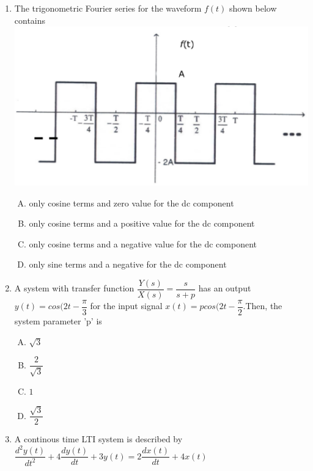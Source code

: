 \documentclass[journal,12pt,twocolumn]{IEEEtran}
\begin{document}
\begin{enumerate}[1.]
\begin{enumerate}[(A)]
\end{enumerate}
\item The trigonometric Fourier series for the waveform $f(t)$ shown below contains\\
\includegraphics[scale=0.4]{fig10.eps}

\begin{enumerate}[(A)]

\setlength\itemsep{1em}

\item only cosine terms and zero value for the dc component
\item only cosine terms and a positive value for the dc component
\item only cosine terms and a negative value for the dc component
\item only sine terms and a negative for the dc component

\end{enumerate}
\item A system with transfer function $\dfrac{Y(s)}{X(s)}=\dfrac{s}{s+p}$ has an output $y(t)=cos(2t-\dfrac{\pi}{3}$ for the input signal $x(t)=p cos(2t-\dfrac{\pi}{2}$.Then, the system parameter 'p' is


\begin{enumerate}[(A)]

\setlength\itemsep{1em}

\item $\sqrt{3}$
\item $\dfrac{2}{\sqrt{3}}$
\item $1$
\item $\dfrac{\sqrt{3}}{2}$

\end{enumerate}

\item A continous time LTI system is described by $\dfrac{d^{2}y(t)}{dt^{2}}+4\dfrac{dy(t)}{dt}+3y(t)=2\dfrac{dx(t)}{dt}+4x(t)$


\end{enumerate}
\end{document}
